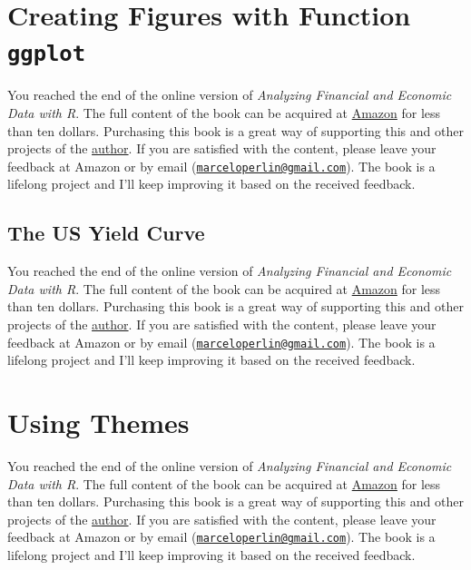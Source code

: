 \documentclass[
  12pt,
]{book}
\newenvironment{pleasebuyit}
{\begin{noteblock}
		
	} {\end{noteblock}}
\begin{document}
\hypertarget{ggplot}{%
\section{\texorpdfstring{Creating Figures with Function \texttt{ggplot}}{Creating Figures with Function ggplot}}\label{ggplot}}

\begin{pleasebuyit}
You reached the end of the online version of \emph{Analyzing Financial
and Economic Data with R}. The full content of the book can be acquired
at \href{https://www.amazon.com/dp/B084LSNXMN}{Amazon} for less than ten
dollars. Purchasing this book is a great way of supporting this and
other projects of the \href{https://www.msperlin.com/blog/}{author}. If
you are satisfied with the content, please leave your feedback at Amazon
or by email
(\href{mailto:marceloperlin@gmail.com}{\nolinkurl{marceloperlin@gmail.com}}).
The book is a lifelong project and I'll keep improving it based on the
received feedback.
\end{pleasebuyit}

\hypertarget{the-us-yield-curve}{%
\subsection{The US Yield Curve}\label{the-us-yield-curve}}

\begin{pleasebuyit}
You reached the end of the online version of \emph{Analyzing Financial
and Economic Data with R}. The full content of the book can be acquired
at \href{https://www.amazon.com/dp/B084LSNXMN}{Amazon} for less than ten
dollars. Purchasing this book is a great way of supporting this and
other projects of the \href{https://www.msperlin.com/blog/}{author}. If
you are satisfied with the content, please leave your feedback at Amazon
or by email
(\href{mailto:marceloperlin@gmail.com}{\nolinkurl{marceloperlin@gmail.com}}).
The book is a lifelong project and I'll keep improving it based on the
received feedback.
\end{pleasebuyit}

\hypertarget{using-themes}{%
\section{Using Themes}\label{using-themes}}

\begin{pleasebuyit}
You reached the end of the online version of \emph{Analyzing Financial
and Economic Data with R}. The full content of the book can be acquired
at \href{https://www.amazon.com/dp/B084LSNXMN}{Amazon} for less than ten
dollars. Purchasing this book is a great way of supporting this and
other projects of the \href{https://www.msperlin.com/blog/}{author}. If
you are satisfied with the content, please leave your feedback at Amazon
or by email
(\href{mailto:marceloperlin@gmail.com}{\nolinkurl{marceloperlin@gmail.com}}).
The book is a lifelong project and I'll keep improving it based on the
received feedback.
\end{pleasebuyit}
\end{document}
